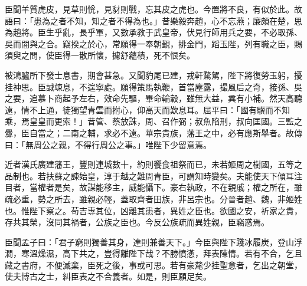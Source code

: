 \begin{pinyinscope}
臣聞羊質虎皮，見草則恱，見豺則戰，忘其皮之虎也。今置將不良，有似於此。故語曰：「患為之者不知，知之者不得為也。」昔樂毅奔趙，心不忘燕；廉頗在楚，思為趙將。臣生乎亂，長乎軍，又數承教于武皇帝，伏見行師用兵之要，不必取孫、吳而闇與之合。竊揆之於心，常願得一奉朝覲，排金門，蹈玉陛，列有職之臣，賜須臾之問，使臣得一散所懷，攄舒蘊積，死不恨矣。

被鴻臚所下發士息書，期會甚急。又聞豹尾已建，戎軒騖駕，陛下將復勞玉躬，擾挂神思。臣誠竦息，不遑寧處。願得策馬執鞭，首當塵露，撮風后之奇，接孫、吳之要，追慕卜商起予左右，效命先驅，畢命輪轂，雖無大益，兾有小補。然天高聽遠，情不上通，徒獨望青雲而拊心，仰高天而歎息耳。屈平曰：「國有驥而不知乘，焉皇皇而更索！」昔管、蔡放誅，周、召作弼；叔魚陷刑，叔向匡國。三監之釁，臣自當之；二南之輔，求必不遠。華宗貴族，藩王之中，必有應斯舉者。故傳曰：「無周公之親，不得行周公之事。」唯陛下少留意焉。

近者漢氏廣建藩王，豐則連城數十，約則饗食祖祭而已，未若姬周之樹國，五等之品制也。若扶蘇之諫始皇，淳于越之難周青臣，可謂知時變矣。夫能使天下傾耳注目者，當權者是矣，故謀能移主，威能懾下。豪右執政，不在親戚；權之所在，雖疏必重，勢之所去，雖親必輕，蓋取齊者田族，非呂宗也。分晉者趙、魏，非姬姓也。惟陛下察之。苟吉專其位，凶離其患者，異姓之臣也。欲國之安，祈家之貴，存共其榮，沒同其禍者，公族之臣也。今反公族疏而異姓親，臣竊惑焉。

臣聞孟子曰：「君子窮則獨善其身，達則兼善天下。」今臣與陛下踐冰履炭，登山浮澗，寒溫燥濕，高下共之，豈得離陛下哉？不勝憤懣，拜表陳情。若有不合，乞且藏之書府，不便滅棄，臣死之後，事或可思。若有豪氂少挂聖意者，乞出之朝堂，使夫博古之士，糾臣表之不合義者。如是，則臣願足矣。


\end{pinyinscope}
